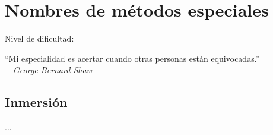 
\chapter{Nombres de métodos especiales}

\noindent Nivel de dificultad:\diflllll

\begin{citaCap}
    ``Mi especialidad es acertar cuando otras personas están equivocadas.'' \\
        ---\emph{\href{https://en.wikiquote.org/wiki/George_Bernard_Shaw}{George Bernard Shaw}}
\end{citaCap}

\section{Inmersión}

...
